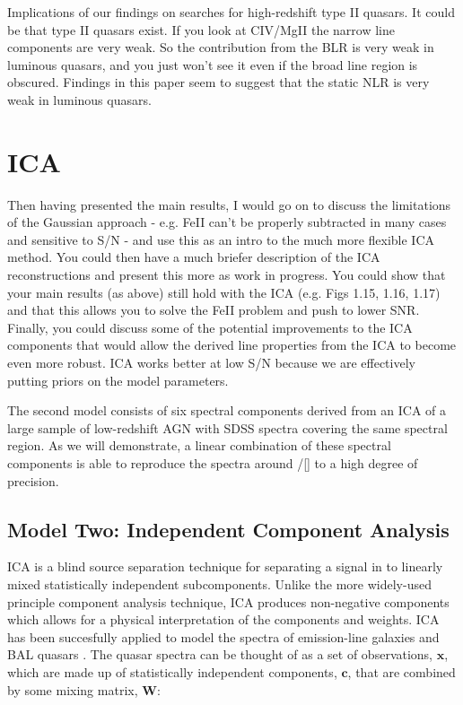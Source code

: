 Implications of our findings on searches for high-redshift type II quasars. 
It could be that type II quasars exist. 
If you look at CIV/MgII the narrow line components are very weak. 
So the contribution from the \ac{BLR} is very weak in luminous quasars, and you just won't see it even if the broad line region is obscured.
Findings in this paper seem to suggest that the static \ac{NLR} is very weak in luminous quasars. 


\section{ICA}

Then having presented the main results, I would go on to discuss the limitations of the Gaussian approach - e.g. FeII can't be properly subtracted in many cases and sensitive to S/N - and use this as an intro to the much more flexible ICA method. You could then have a much briefer description of the ICA reconstructions and present this more as work in progress. You could show that your main results (as above) still hold with the ICA (e.g. Figs 1.15, 1.16, 1.17) and that this allows you to solve the FeII problem and push to lower SNR. Finally, you could discuss some of the potential improvements to the ICA components that would allow the derived line properties from the ICA to become even more robust. ICA works better at low S/N because we are effectively putting priors on the model parameters. 


The second model consists of six spectral components derived from an \ac{ICA} of a large sample of low-redshift \ac{AGN} with \ac{SDSS} spectra covering the same spectral region.
As we will demonstrate, a linear combination of these spectral components is able to reproduce the spectra around \hbns/[] to a high degree of precision.  

\subsection{Model Two: Independent Component Analysis}

\ac{ICA} is a blind source separation technique for separating a signal in to linearly mixed statistically independent subcomponents. 
Unlike the more widely-used principle component analysis technique, \ac{ICA} produces non-negative components which allows for a physical interpretation of the components and weights.  
\ac{ICA} has been succesfully applied to model the spectra of emission-line galaxies \citep{allen13} and BAL quasars \citep{allen11}. 
The quasar spectra can be thought of as a set of observations, $\bm{x}$, which are made up of statistically independent components, $\bm{c}$, that are combined by some mixing matrix, $\bm{W}$:

